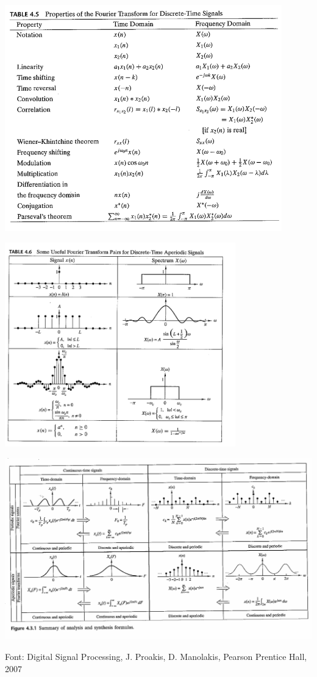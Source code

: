 \documentclass{article}
\begin{document}
\begin{center}
\includegraphics[width=12cm]{tabpropTF.png}
\end{center}

\begin{center}
\includegraphics[width=10cm]{tabTFpairs.png}
\end{center}

\begin{center}
\includegraphics[width=18cm]{sumariTF2.png}
\end{center}


Font: Digital Signal Processing, J. Proakis, D. Manolakis, Pearson Prentice Hall, 2007
\end{document}
